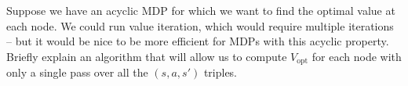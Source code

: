 \item {}
Suppose we have an acyclic MDP for which we want to find the optimal value at
each node.  We could run value iteration, which would require multiple
iterations -- but it would be nice to be more efficient for MDPs with this
acyclic property. Briefly explain an algorithm that will allow us to compute
$V_\text{opt}$ for each node with only a single pass over all the $(s, a, s')$
triples.
